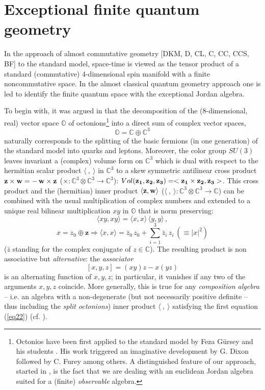 \documentclass{article}
\newcommand{\be}{\begin{equation}}
\newcommand{\ee}{\end{equation}}
\begin{document}
\section{Exceptional finite quantum geometry}\label{sec2}
\setcounter{equation}{0}

In the approach of almost commutative geometry [DKM, D,  CL, C, CC, CCS, BF] to the standard model,  space-time is viewed as the tensor product of a standard (commutative) 4-dimensional spin manifold with a finite noncommutative space. In the almost classical quantum geometry approach one is led to identify the finite quantum space with the exceptional Jordan algebra.\\

\smallskip

To begin with, it was argued in \cite{DV} that the decomposition of the (8-dimensional, real) vector space ${\mathbb O}$ of octonions\footnote{Octonios have been first applied to the standard model by Feza G\"ursey and his students \cite{G}. His work triggered an imaginative development by G. Dixon \cite{Di} followed by C. Furey \cite{Fu} among others. A distinguished feature of our approach, started in \cite{DV}, is the fact that we are dealing with an euclidean Jordan algebra suited for a (finite) \textit{observable} algebra.} into a direct sum of complex vector spaces,
\be
\label{eq21}
{\mathbb O} = {\mathbb C} \oplus {\mathbb C}^3
\ee
naturally corresponds to the splitting of the basic fermions (in one generation) of the standard model into quarks and leptons. Moreover, the color group $SU(3)$ leaves invariant a (complex) volume form on ${\mathbb C}^3$ which is dual with respect to the hermitian scalar product $\langle \ , \ \rangle$ in ${\mathbb C}^3$ to a skew symmetric antilinear cross product ${\bf z} \times {\bf w} = - \, {\bf w} \times {\bf z}$ ($\times : {\mathbb C}^3 \otimes {\mathbb C}^3 \to {\mathbb C}^3$): $Vol({\bf z_1}, {\bf z_2}, {\bf z_3})=<{\bf z_1}\times{\bf z_2}, {\bf z_3}>$. This cross product and the (hermitian) inner product $\langle {\bf z,w} \rangle$ ($\langle \ , \ \rangle : {\mathbb C}^3 \otimes {\mathbb C}^3 \to {\mathbb C}$) can be combined with the usual multiplication of complex numbers and extended to a unique real bilinear multiplication $xy$ in ${\mathbb O}$ that is norm preserving: 
$$
\langle xy , xy \rangle = \langle x,x \rangle \, \langle y,y \rangle \, ,
$$
\be
\label{eq22}
x = z_0 \oplus {\bm z} \Rightarrow \langle x,x \rangle = \bar z_0 \, z_0 + \sum_{i=1}^3 \bar z_i \, z_i \ (\equiv \vert x \vert^2)
\ee
($\bar z$ standing for the complex conjugate of $z \in {\mathbb C}$). The resulting product is non associative but {\it alternative}: the {\it associator}
\be
\label{eq23}
[x,y,z] = (xy)z - x(yz)
\ee
is an alternating function of $x,y,z$; in particular, it vanishes if any two of the arguments $x,y,z$ coincide. More generally, this is true for any {\it composition algebra} -- i.e. an algebra with a non-degenerate (but not necessarily positive definite -- thus including the {\it split octonions}) inner product $\langle \ , \ \rangle$ satisfying the first equation (\ref{eq22}) (cf. \cite {BS}).
\end{document}
